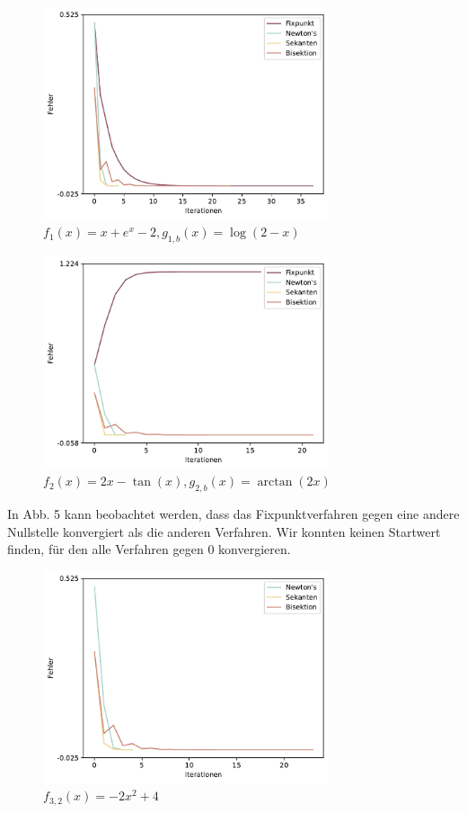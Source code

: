 \documentclass[a4paper,12pt]{article}
\newcommand{\1}{1\hspace{-0,9ex}1}
\begin{document}
\begin{figure}[H]
	\centering
	\includegraphics[width=0.75\textwidth]{plots/error_series_plot.pdf}
	\caption{$f_1(x) = x + e^x-2, g_{1,b}(x)=\log(2-x)$}
\end{figure}

\begin{figure}[H]
	\centering
	\includegraphics[width=0.75\textwidth]{plots/error_series_plot(1).pdf}
	\caption{$f_2(x) = 2x - \tan(x), g_{2,b}(x)=\arctan(2x)$}
\end{figure}

In Abb. 5 kann beobachtet werden, dass das Fixpunktverfahren gegen eine andere Nullstelle konvergiert als die anderen Verfahren. Wir konnten keinen Startwert finden, für den alle Verfahren gegen $0$ konvergieren.

\begin{figure}[H]
	\centering
	\includegraphics[width=0.75\textwidth]{plots/error_series_plot(2).pdf}
	\caption{$f_{3,2}(x) = -2x^2 + 4$}
\end{figure}
\end{document}
